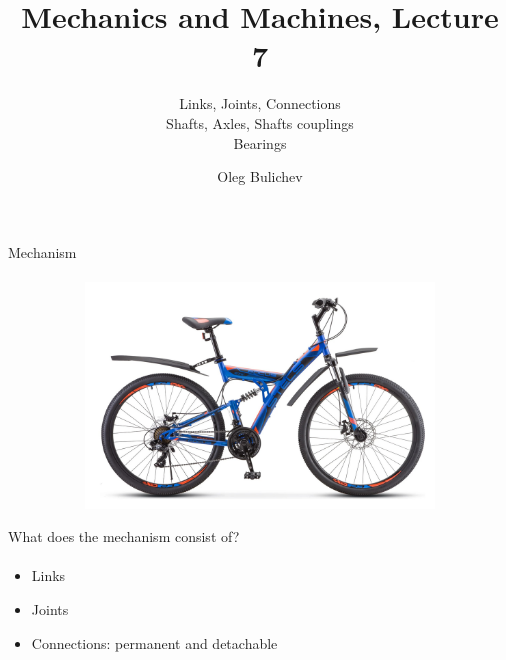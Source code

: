 \documentclass[aspectratio=169]{beamer}
\title[MaM]{Mechanics and Machines, Lecture 7} %
\subtitle{Links, Joints, Connections
\\ Shafts, Axles, Shafts couplings \\   
Bearings} %
\author{Oleg Bulichev}
\newcommand{\fbckg}[1]{\usebackgroundtemplate{\texttt{[image: \#1]}}}%
\begin{document}
\setlength{\abovedisplayskip}{0pt}
\setlength{\belowdisplayskip}{0pt}
\setlength{\abovedisplayshortskip}{0pt}
\setlength{\belowdisplayshortskip}{0pt}

\fbckg{fibeamer/figs/title_page.png}

\fbckg{fibeamer/figs/common.png}

\note{\scriptsize \begin{itemize}
        \item \ 
    \end{itemize}}

\begin{frame}[t]{Mechanism}
\framesubtitle{}
    \vspace{-0.6cm}
    \begin{figure}[H]
        \centering\includegraphics[height=6cm,width=1\textwidth,keepaspectratio]{bike.jpg}
        \label{fig:bike.jpg}
    \end{figure}
\end{frame}

\begin{frame}[t]{What does the mechanism consist of?}
\framesubtitle{}
    \begin{itemize}
        \item Links
        \item Joints
        \item Connections: permanent and detachable
    \end{itemize}
\end{frame}
\end{document}
